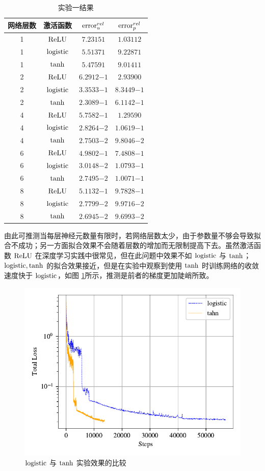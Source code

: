 \begin{table}[H]
    \centering
    \caption{实验一结果}
    \begin{tabular}{cccc}
        \toprule
        网络层数 & 激活函数 & $\mathrm{error}^{rel}_{u}$ & $\mathrm{error}^{rel}_{p}$ \\
        \midrule
        1  & $\mathrm{ReLU}$ & $\num{7.2315}{1}$ & $\num{1.0311}{2}$ \\
        1  & $\mathrm{logistic} $ & $\num{5.5137}{1}$ & $\num{9.2287}{1}$ \\
        1  & $\tanh $ & $\num{5.4759}{1}$ & $\num{9.0141}{1}$ \\
        2  & $\mathrm{ReLU}$ & $\num{6.2912}{-1}$ & $\num{2.9390}{0}$ \\
        2  & $\mathrm{logistic} $ & $\num{3.3533}{-1}$ & $\num{8.3449}{-1}$ \\
        2  & $\tanh $ & $\num{2.3089}{-1}$ & $\num{6.1142}{-1}$ \\
        4  & $\mathrm{ReLU}$ & $\num{5.7582}{-1}$ & $\num{1.2959}{0}$ \\
        4  & $\mathrm{logistic} $ & $\num{2.8264}{-2}$ & $\num{1.0619}{-1}$ \\
        4  & $\tanh $ & $\num{2.7503}{-2}$ & $\num{9.8046}{-2}$ \\
        6  & $\mathrm{ReLU}$ & $\num{4.9802}{-1}$ & $\num{7.4808}{-1}$ \\
        6  & $\mathrm{logistic} $ & $\num{3.0148}{-2}$ & $\num{1.0793}{-1}$ \\
        6  & $\tanh $ & $\num{2.7495}{-2}$ & $\num{1.0071}{-1}$ \\
        8  & $\mathrm{ReLU}$ & $\num{5.1132}{-1}$ & $\num{9.7828}{-1}$ \\
        8  & $\mathrm{logistic} $ & $\num{2.7799}{-2}$ & $\num{9.9716}{-2}$ \\
        8  & $\tanh $ & $\num{2.6945}{-2}$ & $\num{9.6993}{-2}$ \\
        \bottomrule
    \end{tabular}
    \label{tab:example1}
\end{table}

由此可推测当每层神经元数量有限时，若网络层数太少，由于参数量不够会导致拟合不成功；另一方面拟合效果不会随着层数的增加而无限制提高下去。虽然激活函数 $\mathrm{ReLU}$ 在深度学习实践中很常见，但在此问题中效果不如 $\mathrm{logistic}$ 与 $\tanh$；$\mathrm{logistic}, \tanh$ 的拟合效果接近，但是在实验中观察到使用 $\tanh$ 时训练网络的收敛速度快于 $\mathrm{logistic}$，如图 \ref{fig:example1_loss}所示，推测是前者的梯度更加陡峭所致。

\begin{figure}[H]
    \centering
    \includegraphics[width=0.4\linewidth]{images/example1_loss.pdf}
    \caption{$\mathrm{logistic}$ 与 $\tanh$ 实验效果的比较}
    \label{fig:example1_loss}
\end{figure}

